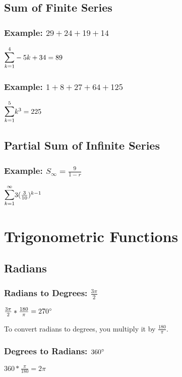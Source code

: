 \documentclass[12pt, english]{article}
\begin{document}
	\subsection{Sum of Finite Series}
	\subsubsection*{Example: $29 + 24 + 19 + 14$}
	\begin{center}
		$\mathlarger{\mathlarger{\sum}}_{k=1}^{4} -5k+34 = 89$
	\end{center}
	\subsubsection*{Example: $1 + 8 + 27 + 64 + 125$}
	\begin{center}
		$\mathlarger{\mathlarger{\sum}}_{k=1}^{5} k^3 = 225$
	\end{center}
	\subsection{Partial Sum of Infinite Series}
	\subsubsection*{Example: $S_\infty = \frac{9}{1-r}$}
	\begin{center}
		$\mathlarger{\mathlarger{\sum}}_{k=1}^{\infty} 3(\frac{3}{10})^{k-1}$
	\end{center}
	\section{Trigonometric Functions}
	\subsection{Radians}
	\subsubsection*{Radians to Degrees: $\frac{3\pi}{2}$}
	\begin{center}
		$\frac{3\pi}{2} * \frac{180}{\pi} = 270\degree$
	\end{center}
	To convert radians to degrees, you multiply it by $\frac{180}{\pi}$.
	\subsubsection*{Degrees to Radians: $360\degree$}
	\begin{center}
		$360 * \frac{\pi}{180} = 2\pi$
	\end{center}
\end{document}
